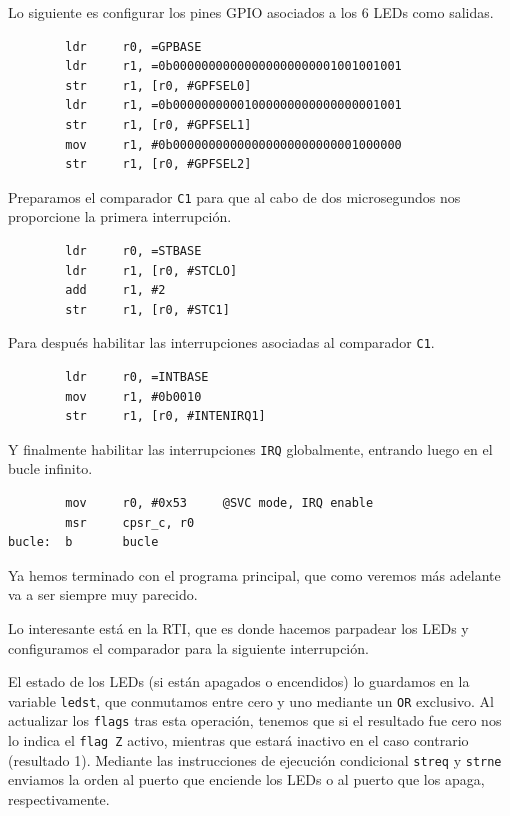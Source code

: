 Lo siguiente es configurar los pines GPIO asociados a los 6 LEDs como salidas.

\begin{lstlisting}
        ldr     r0, =GPBASE
        ldr     r1, =0b00000000000000000000001001001001
        str     r1, [r0, #GPFSEL0]
        ldr     r1, =0b00000000001000000000000000001001
        str     r1, [r0, #GPFSEL1]
        mov     r1, #0b00000000000000000000000001000000
        str     r1, [r0, #GPFSEL2]
\end{lstlisting}

Preparamos el comparador {\tt C1} para que al cabo de dos microsegundos nos proporcione la primera
interrupción.

\begin{lstlisting}
        ldr     r0, =STBASE
        ldr     r1, [r0, #STCLO]
        add     r1, #2
        str     r1, [r0, #STC1]
\end{lstlisting}

Para después habilitar las interrupciones asociadas al comparador {\tt C1}.

\begin{lstlisting}
        ldr     r0, =INTBASE
        mov     r1, #0b0010
        str     r1, [r0, #INTENIRQ1]
\end{lstlisting}

Y finalmente habilitar las interrupciones {\tt IRQ} globalmente, entrando luego en
el bucle infinito.

\begin{lstlisting}
        mov     r0, #0x53     @SVC mode, IRQ enable
        msr     cpsr_c, r0
bucle:  b       bucle
\end{lstlisting}

Ya hemos terminado con el programa principal, que como veremos más adelante va a ser
siempre muy parecido.

Lo interesante está en la RTI, que es donde hacemos parpadear los LEDs y configuramos
el comparador para la siguiente interrupción.

El estado de los LEDs (si están apagados o encendidos) lo guardamos en la variable
{\tt ledst}, que conmutamos entre cero y uno mediante un {\tt OR} exclusivo. Al
actualizar los {\tt flags} tras esta operación, tenemos que si el resultado fue
cero nos lo indica el {\tt flag Z} activo, mientras que estará inactivo en el
caso contrario (resultado 1). Mediante las instrucciones de ejecución condicional
{\tt streq} y {\tt strne} enviamos la orden al puerto que enciende los LEDs o al
puerto que los apaga, respectivamente.

